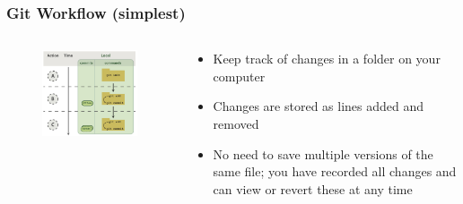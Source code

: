\documentclass{beamer}
\begin{document}
\begin{frame}
\frametitle{Git Workflow (simplest)}

\begin{columns}
	\begin{column}{0.618\linewidth}
		\begin{figure}
			\includegraphics[width=\linewidth]{images/local-workflow}
			\caption{ \cite{Blischak2016}}
		\end{figure}
	\end{column}
	\begin{column}{0.382\linewidth}
		\begin{itemize}
			\item<1-> Keep track of changes in a folder on your computer
			\item<2-> Changes are stored as lines added and removed
			\item<3-> No need to save multiple versions of the same file; you have recorded all changes and can view or revert these at any time
		\end{itemize}
	\end{column}
\end{columns}


\end{frame}
\end{document}
